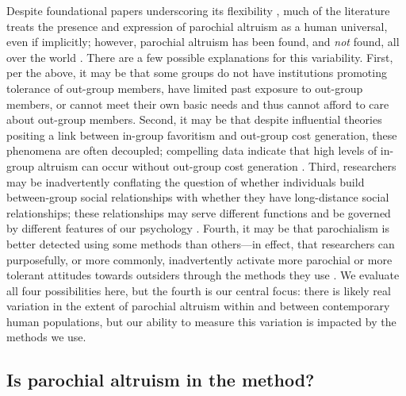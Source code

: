 \documentclass[bibauthoryear]{aa}
\begin{document}
Despite foundational papers underscoring its flexibility \citep{bowles2003origins, bowles2004persistent, choi2007coevolution}, much of the literature treats the presence and expression of parochial altruism as a human universal, even if implicitly; however, parochial altruism has been found, and \emph{not} found, all over the world \citep{Rusch2014, Baldassarri1183}. There are a few possible explanations for this variability. First, per the above, it may be that some groups do not have institutions promoting tolerance of out-group members, have limited past exposure to out-group members, or cannot meet their own basic needs and thus cannot afford to care about out-group members. Second, it may be that despite influential theories positing a link between in-group favoritism and out-group cost generation, these phenomena are often decoupled; compelling data indicate that high levels of in-group altruism can occur without out-group cost generation \citep{purzycki2019identity, hruschka2013economic, yamagishi2016parochial, brewer2006evolutionary, schaub2017threat, cashdan2001ethnocentrism, Rusch2014, de2014parochial}. Third, researchers may be inadvertently conflating the question of whether individuals build between-group social relationships with whether they have long-distance social relationships; these relationships may serve different functions and be governed by different features of our psychology \citep{pisorjones2020}. Fourth, it may be that parochialism is better detected using some methods than others---in effect, that researchers can purposefully, or more commonly, inadvertently activate more parochial or more tolerant attitudes towards outsiders through the methods they use \citep{Pisor2020}. We evaluate all four possibilities here, but the fourth is our central focus: there is likely real variation in the extent of parochial altruism within and between contemporary human populations, but our ability to measure this variation is impacted by the methods we use. %

\subsection{Is parochial altruism in the method?}\label{inthemethod}
\end{document}
